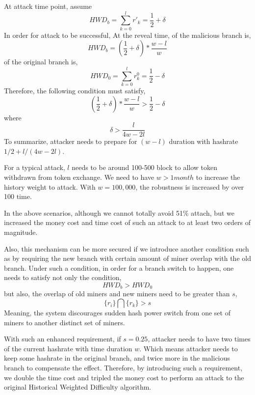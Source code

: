 \documentclass[conference]{IEEEtran}
\begin{document}
At attack time point, assume
\begin{equation}
    H\!W\!D_b= \sum_{k=0}^{l}r'_k=\frac{1}{2} + \delta\label{eq}
\end{equation}
In order for attack to be successful, At the reveal time,  of the malicious branch is,
\begin{equation}
    H\!W\!D_b= (\frac{1}{2} + \delta) * \frac{w-l}{w}\label{eq}
\end{equation}
 of the original branch is,
\begin{equation}
    H\!W\!D_0 = \sum_{k=0}^{l} r_{k}^{0} =  \frac{1}{2} - \delta\label{eq}
\end{equation}
Therefore, the following condition must satisfy,
\begin{equation}
    (\frac{1}{2} + \delta) * \frac{w-l}{w} > \frac{1}{2}-\delta\label{eq}
\end{equation}
where
\begin{equation}
\delta>\frac{l}{4w-2l}\label{eq}
\end{equation}
To summarize, attacker needs to prepare for $(w-l)$ duration with hashrate $1/2+l/(4w-2l)$.

For a typical attack, $l$ needs to be around 100-500 block to allow token withdrawn from token exchange. We need to have $w > 1 month$ to increase the history weight to attack. With $w = 100,000$, the robustness is increased by over 100 time. 

In the above scenarios, although we cannot totally avoid 51\% attach, but we increased the money cost and time cost of such an attack to at least two orders of magnitude.

Also, this mechanism can be more secured if we introduce another condition such as by requiring the new branch with certain amount of miner overlap with the old branch. Under such a condition, in order for a branch switch to happen, one needs to satisfy not only the  condition,
\begin{equation}
    H\!W\!D_b>H\!W\!D_0\label{eq}
\end{equation} 
but also, the overlap of old miners and new miners need to be greater than $s$,
\begin{equation}
    \{r_i\}\bigcap\{r_k\}>s\label{eq}
\end{equation}
Meaning, the system discourages sudden hash power switch from one set of miners to another distinct set of miners.

With such an enhanced requirement, if $s=0.25$, attacker needs to have two times of the current hashrate with time duration $w$. Which means attacker needs to keep some hashrate in the original branch, and twice more in the malicious branch to compensate the effect. Therefore, by introducing such a requirement, we double the time cost and tripled the money cost to perform an attack to the original Historical Weighted Difficulty algorithm.
\end{document}
